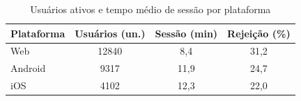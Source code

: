 \begin{table}[htbp]
\begin{tabela}{\caption{Usuários ativos e tempo médio de sessão por plataforma}\label{tab:guia-simples}}{\elaboracaopropria{}}
  \begin{tabular}{l S[table-format=5.0] S[table-format=2.1] S[table-format=2.1]}
    \toprule
    \textbf{Plataforma} & {\textbf{Usuários (un.)}} & {\textbf{Sessão (min)}} & {\textbf{Rejeição (\%)}} \\
    \midrule
    Web     & 12840 &  8,4 & 31,2 \\
    Android &  9317 & 11,9 & 24,7 \\
    iOS     &  4102 & 12,3 & 22,0 \\
    \bottomrule
  \end{tabular}
\end{tabela}
\end{table}
